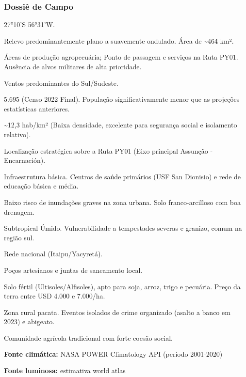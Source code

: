 \subsubsection{Dossiê de Campo}
\begin{description}[style=nextline,leftmargin=0.5cm,font=\bfseries]
\item[Coordenadas]  27°10'S 56°31'W.
\item[Topografia]  Relevo predominantemente plano a suavemente ondulado. Área de \textasciitilde 464 km².
\item[Alvos Estratégicos]  Áreas de produção agropecuária; Ponto de passagem e serviços na Ruta PY01. Ausência de alvos militares de alta prioridade.
\item[Fallout]  Ventos predominantes do Sul/\allowbreak Sudeste.
\item[População]  5.695 (Censo 2022 Final). População significativamente menor que as projeções estatísticas anteriores.
\item[Densidade]  \textasciitilde 12,3 hab/\allowbreak km² (Baixa densidade, excelente para segurança social e isolamento relativo).
\item[Vias de Acesso]  Localização estratégica sobre a Ruta PY01 (Eixo principal Assunção - Encarnación).
\item[Serviços]  Infraestrutura básica. Centros de saúde primários (USF San Dionisio) e rede de educação básica e média.
\item[Hidrologia]  Baixo risco de inundações graves na zona urbana. Solo franco-arcilloso com boa drenagem.
\item[Clima]  Subtropical Úmido. Vulnerabilidade a tempestades severas e granizo, comum na região sul.
\item[Energia]  Rede nacional (Itaipu/\allowbreak Yacyretá).
\item[Água]  Poços artesianos e juntas de saneamento local.
\item[Recursos Locais]  Solo fértil (Ultisoles/\allowbreak Alfisoles), apto para soja, arroz, trigo e pecuária. Preço da terra entre USD 4.000 e 7.000/\allowbreak ha.
\item[Segurança]  Zona rural pacata. Eventos isolados de crime organizado (asalto a banco em 2023) e abigeato.
\item[Estabilidade]  Comunidade agrícola tradicional com forte coesão social.
\end{description}
\textbf{Fonte climática:} NASA POWER Climatology API (período 2001-2020)

\textbf{Fonte luminosa:} estimativa world atlas

